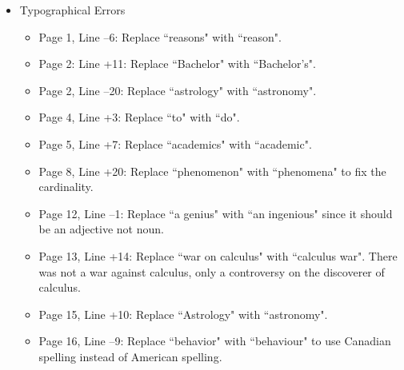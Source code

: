 \documentclass[11pt]{article}
\begin{document}
\begin{itemize}
	\item Typographical Errors
	\begin{itemize}
		\item Page 1, Line --6: Replace ``reasons" with ``reason".
		\item Page 2: Line +11: Replace ``Bachelor" with ``Bachelor's".
		\item Page 2, Line --20: Replace ``astrology" with ``astronomy".
		\item Page 4, Line +3: Replace ``to" with ``do".
		\item Page 5, Line +7: Replace ``academics" with ``academic".
		\item Page 8, Line +20: Replace ``phenomenon" with ``phenomena" to fix the cardinality.
		\item Page 12, Line --1: Replace ``a genius" with ``an ingenious" since it should be an adjective not noun.
		\item Page 13, Line +14: Replace ``war on calculus" with ``calculus war". There was not a war against calculus, only a controversy on the discoverer of calculus.
		\item Page 15, Line +10: Replace ``Astrology" with ``astronomy".
		\item Page 16, Line --9: Replace ``behavior" with ``behaviour" to use Canadian spelling instead of American spelling.
	\end{itemize}
	

\end{itemize}
\end{document}
